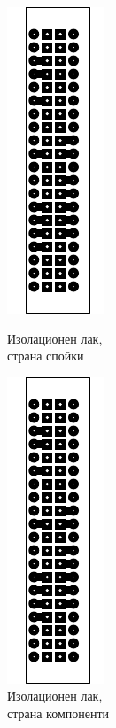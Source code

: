 \begin{figure}[!htb]
    \begin{minipage}{0.49\linewidth}
        \centering
        \includegraphics[page=5]{documents/dev_board.pdf}
        \caption{Изолационен лак,\\страна спойки}
        \label{fig:dev_top_res}
    \end{minipage}
    \hfill
    \begin{minipage}{0.49\linewidth}
        \centering
        \includegraphics[page=6]{documents/dev_board.pdf}
        \caption{Изолационен лак,\\страна компоненти}
        \label{fig:dev_bot_res}
    \end{minipage}
\end{figure}
